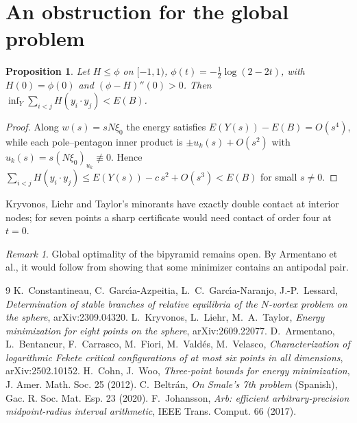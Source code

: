 \documentclass[11pt]{amsart}
\newtheorem{proposition}[theorem]{Proposition}
\theoremstyle{remark}
\newtheorem{remark}[theorem]{Remark}
\begin{document}
\section{An obstruction for the global problem}
\begin{proposition}
Let $H\le\phi$ on $[-1,1)$, $\phi(t)=-\frac12\log(2-2t)$, with $H(0)=\phi(0)$ and $(\phi-H)''(0)>0$.
Then $\inf_Y\sum_{i<j}H(y_i\cdot y_j)<E(B)$.
\end{proposition}
\begin{proof}
Along $w(s)=sN\xi_0$ the energy satisfies $E(Y(s))-E(B)=O(s^4)$, while each pole--pentagon inner product
is $\pm u_k(s)+O(s^2)$ with $u_k(s)=s(N\xi_0)_{u_k}\not\equiv0$. Hence
$\sum_{i<j}H(y_i\cdot y_j)\le E(Y(s))-c\,s^2+O(s^3)<E(B)$ for small $s\neq0$.
\end{proof}
Kryvonos, Liehr and Taylor's minorants have exactly double contact at interior nodes; for seven points a
sharp certificate would need contact of order four at $t=0$.

\begin{remark}
Global optimality of the bipyramid remains open. By Armentano et al., it would follow from showing that
some minimizer contains an antipodal pair.
\end{remark}

\begin{thebibliography}{9}
 K.~Constantineau, C.~Garc\'{\i}a-Azpeitia, L.~C.~Garc\'{\i}a-Naranjo, J.-P.~Lessard,
\emph{Determination of stable branches of relative equilibria of the $N$-vortex problem on the sphere},
arXiv:2309.04320.
 L.~Kryvonos, L.~Liehr, M.~A.~Taylor, \emph{Energy minimization for eight points on the sphere},
arXiv:2609.22077.
 D.~Armentano, L.~Bentancur, F.~Carrasco, M.~Fiori, M.~Vald\'es, M.~Velasco,
\emph{Characterization of logarithmic Fekete critical configurations of at most six points in all dimensions},
arXiv:2502.10152.
 H.~Cohn, J.~Woo, \emph{Three-point bounds for energy minimization}, J. Amer. Math. Soc. 25 (2012).
 C.~Beltr\'an, \emph{On Smale's 7th problem} (Spanish), Gac. R. Soc. Mat. Esp. 23 (2020).
 F.~Johansson, \emph{Arb: efficient arbitrary-precision midpoint-radius interval arithmetic},
IEEE Trans. Comput. 66 (2017).
\end{thebibliography}
\end{document}
